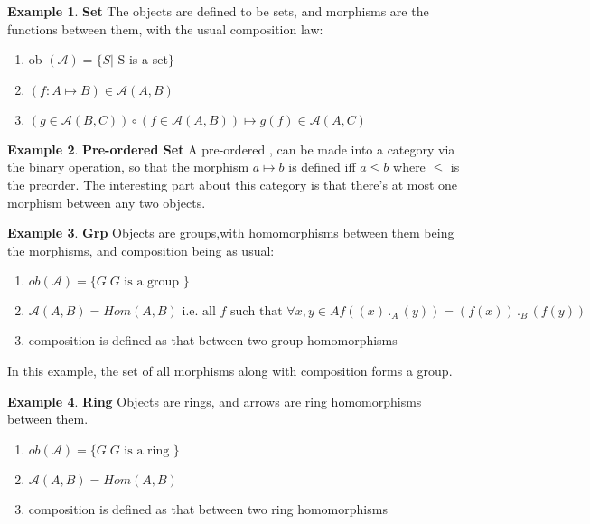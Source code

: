 \documentclass{article}
\theoremstyle{definition}
\newtheorem{example}{Example}[section]
\theoremstyle{definition}
\begin{document}
\begin{example}{\textbf{Set}} %
	The objects are defined to be sets, and morphisms are the functions between them, with the usual composition law:
	\begin{enumerate}[label=\roman*] %
	\item ob $ (\mathcal{A}) = \{ S | $  S is a set$ \} $
	\item $  (f:A \mapsto B )\in \mathcal{A}(A,B)$
	\item  $ (g \in \mathcal{A}(B,C))  \circ (f \in \mathcal{A}(A,B)) \mapsto  g(f) \in \mathcal{A}(A,C) $
	\end{enumerate}
\end{example}
\begin{example}{\textbf{Pre-ordered Set}} %
A pre-ordered , can be made into a category via the binary operation, so that the morphism $ a \mapsto b $ is defined iff $ a\leq b $ where $ \leq  $ is the preorder.
The interesting part about this category is that there's at most one morphism between any two objects.
\end{example}
\begin{example}{\textbf{Grp}} %
Objects are groups,with homomorphisms between them being the morphisms, and composition being as usual:
	\begin{enumerate}[label=\roman*]
	\item $  ob(\mathcal{A} ) = \{G| G \text{ is a group } \}  $
	\item $ \mathcal{A} (A,B)= Hom(A,B) \text{ i.e. all } f \text{ such that } \forall x,y \in A f((x) \, ._A \, (y))=(f(x)) \,._B\,(f(y))      $
	\item  composition is defined as that between two group homomorphisms
\end{enumerate}
In this example, the set of all morphisms along with composition forms a group.
\end{example}
\begin{example}{\textbf{Ring}} %
Objects are rings, and arrows are ring homomorphisms between them.
\begin{enumerate}[label=\roman*]
	\item $  ob(\mathcal{A} ) = \{G| G \text{ is a ring } \}  $
	\item $ \mathcal{A} (A,B) = Hom(A,B) $
	\item  composition is defined as that between two ring homomorphisms
\end{enumerate}
\end{example}
\end{document}
